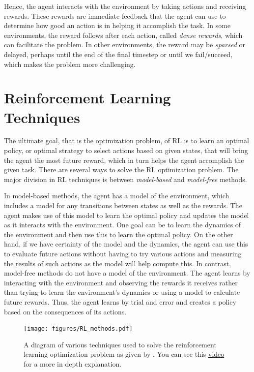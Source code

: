 Hence, the agent interacts with the environment by taking actions and receiving rewards.
These rewards are immediate feedback that the agent can use to determine how good an action is in helping it accomplish the task.
In some environments, the reward follows after each action, called \emph{dense rewards}, which can facilitate the problem.
In other environments, the reward may be \emph{sparsed} or delayed, perhaps until the end of the final timestep or until we fail/succeed, which makes the problem more challenging.

\section*{Reinforcement Learning Techniques}
The ultimate goal, that is the optimization problem, of RL is to learn an optimal policy, or optimal strategy to select actions based on given states, that will bring the agent the most future reward, which in turn helps the agent accomplish the given task.
There are several ways to solve the RL optimization problem.
The major division in RL techniques is between \emph{model-based} and \emph{model-free} methods.

In model-based methods, the agent has a model of the environment, which includes a model for any transitions between states as well as the rewards.
The agent makes use of this model to learn the optimal policy and updates the model as it interacts with the environment.
One goal can be to learn the dynamics of the environment and then use this to learn the optimal policy.
On the other hand, if we have certainty of the model and the dynamics, the agent can use this to evaluate future actions without having to try various actions and measuring the results of such actions as the model will help compute this.
In contrast, model-free methods do not have a model of the environment.
The agent learns by interacting with the environment and observing the rewards it receives rather than trying to learn the environment's dynamics or using a model to calculate future rewards.
Thus, the agent learns by trial and error and creates a policy based on the consequences of its actions.

\begin{figure}[H]
    \centering
    \texttt{[image: figures/RL\_methods.pdf]}
    \caption{A diagram of various techniques used to solve the reinforcement learning optimization problem as given by \cite{brunton2022data}.
    You can see this \href{https://www.youtube.com/watch?v=i7q8bISGwMQ&list=PLMrJAkhIeNNQe1JXNvaFvURxGY4gE9k74&index=4}{video} for a more in depth explanation.}
\end{figure}

